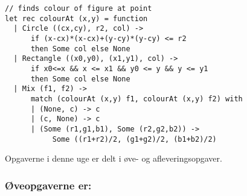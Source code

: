 \documentclass[a4paper]{article}
\begin{document}
\begin{verbatim}
// finds colour of figure at point
let rec colourAt (x,y) = function
  | Circle ((cx,cy), r2, col) ->
      if (x-cx)*(x-cx)+(y-cy)*(y-cy) <= r2
      then Some col else None
  | Rectangle ((x0,y0), (x1,y1), col) ->
      if x0<=x && x <= x1 && y0 <= y && y <= y1
      then Some col else None
  | Mix (f1, f2) ->
      match (colourAt (x,y) f1, colourAt (x,y) f2) with
      | (None, c) -> c
      | (c, None) -> c
      | (Some (r1,g1,b1), Some (r2,g2,b2)) ->
           Some ((r1+r2)/2, (g1+g2)/2, (b1+b2)/2)
\end{verbatim}

\vspace{1ex}

\noindent
Opgaverne i denne uge er delt i øve- og afleveringsopgaver.

\subsubsection*{Øveopgaverne er:}
\end{document}
